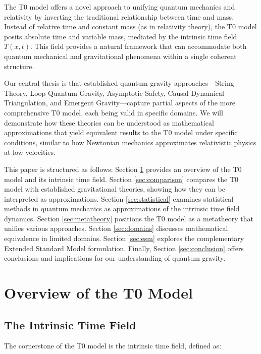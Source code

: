 \documentclass[12pt,a4paper]{article}
\newcommand{\Tfieldt}{T(x,t)}
\begin{document}
	The T0 model \cite{pascher_part1_2025,pascher_part2_2025} offers a novel approach to unifying quantum mechanics and relativity by inverting the traditional relationship between time and mass. Instead of relative time and constant mass (as in relativity theory), the T0 model posits absolute time and variable mass, mediated by the intrinsic time field $\Tfieldt$. This field provides a natural framework that can accommodate both quantum mechanical and gravitational phenomena within a single coherent structure.
	
	Our central thesis is that established quantum gravity approaches—String Theory, Loop Quantum Gravity, Asymptotic Safety, Causal Dynamical Triangulation, and Emergent Gravity—capture partial aspects of the more comprehensive T0 model, each being valid in specific domains. We will demonstrate how these theories can be understood as mathematical approximations that yield equivalent results to the T0 model under specific conditions, similar to how Newtonian mechanics approximates relativistic physics at low velocities.
	
	This paper is structured as follows: Section \ref{sec:t0_overview} provides an overview of the T0 model and its intrinsic time field. Section \ref{sec:comparison} compares the T0 model with established gravitational theories, showing how they can be interpreted as approximations. Section \ref{sec:statistical} examines statistical methods in quantum mechanics as approximations of the intrinsic time field dynamics. Section \ref{sec:metatheory} positions the T0 model as a metatheory that unifies various approaches. Section \ref{sec:domains} discusses mathematical equivalence in limited domains. Section \ref{sec:esm} explores the complementary Extended Standard Model formulation. Finally, Section \ref{sec:conclusion} offers conclusions and implications for our understanding of quantum gravity.
	
	\section{Overview of the T0 Model}
	\label{sec:t0_overview}
	
	\subsection{The Intrinsic Time Field}
	\label{subsec:time_field}
	
	The cornerstone of the T0 model is the intrinsic time field, defined as:
	
\end{document}
